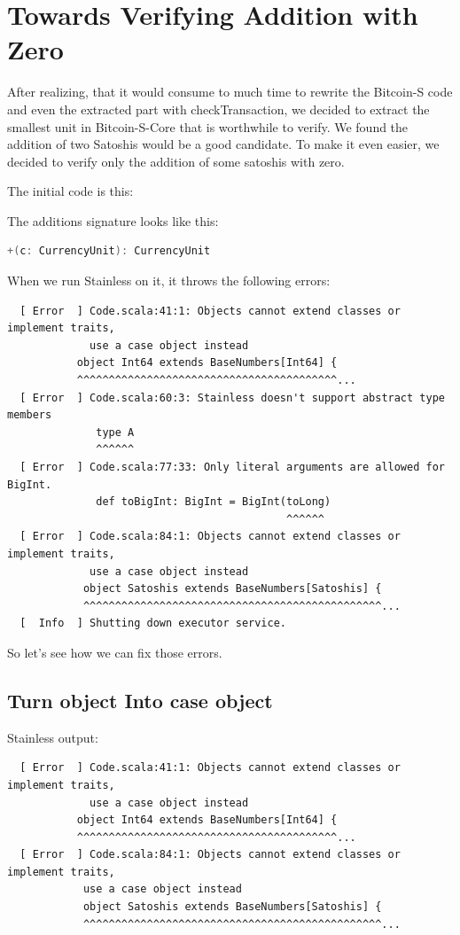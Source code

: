 \chapter{Towards Verifying Addition with Zero}
\label{chap:verify_add}

After realizing, that it would consume to much time to rewrite the Bitcoin-S code and even the extracted part with checkTransaction, we decided to extract the smallest unit in Bitcoin-S-Core that is worthwhile to verify.
We found the addition of two Satoshis would be a good candidate.
To make it even easier, we decided to verify only the addition of some satoshis with zero.

The initial code is this:


The additions signature looks like this:
\begin{lstlisting}[language=scala]
  +(c: CurrencyUnit): CurrencyUnit
\end{lstlisting}

When we run Stainless on it, it throws the following errors:
{\footnotesize\begin{verbatim}
  [ Error  ] Code.scala:41:1: Objects cannot extend classes or implement traits,
             use a case object instead
           object Int64 extends BaseNumbers[Int64] {
           ^^^^^^^^^^^^^^^^^^^^^^^^^^^^^^^^^^^^^^^^^...
  [ Error  ] Code.scala:60:3: Stainless doesn't support abstract type members
              type A
              ^^^^^^
  [ Error  ] Code.scala:77:33: Only literal arguments are allowed for BigInt.
              def toBigInt: BigInt = BigInt(toLong)
                                            ^^^^^^
  [ Error  ] Code.scala:84:1: Objects cannot extend classes or implement traits,
             use a case object instead
            object Satoshis extends BaseNumbers[Satoshis] {
            ^^^^^^^^^^^^^^^^^^^^^^^^^^^^^^^^^^^^^^^^^^^^^^^...
  [  Info  ] Shutting down executor service.
\end{verbatim}}

So let's see how we can fix those errors.


\section{Turn object Into case object}

Stainless output:
{\footnotesize\begin{verbatim}
  [ Error  ] Code.scala:41:1: Objects cannot extend classes or implement traits,
             use a case object instead
           object Int64 extends BaseNumbers[Int64] {
           ^^^^^^^^^^^^^^^^^^^^^^^^^^^^^^^^^^^^^^^^^...
  [ Error  ] Code.scala:84:1: Objects cannot extend classes or implement traits,
            use a case object instead
            object Satoshis extends BaseNumbers[Satoshis] {
            ^^^^^^^^^^^^^^^^^^^^^^^^^^^^^^^^^^^^^^^^^^^^^^^...
\end{verbatim}}

